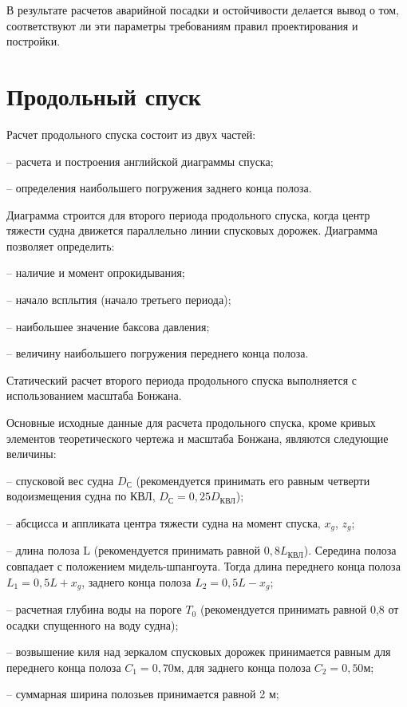 В результате расчетов аварийной посадки и остойчивости делается вывод о том, соответствуют ли эти параметры требованиям правил проектирования и постройки.

\section{Продольный спуск}

Расчет продольного спуска состоит из двух частей:

-- расчета и построения английской диаграммы спуска;

-- определения наибольшего погружения заднего конца полоза.


Диаграмма строится для второго периода продольного спуска, когда центр тяжести судна движется параллельно линии спусковых дорожек.
Диаграмма позволяет определить:

-- наличие и момент опрокидывания;

-- начало всплытия (начало третьего периода);

-- наибольшее значение баксова давления;

-- величину наибольшего погружения переднего конца полоза.

Статический расчет второго периода продольного спуска выполняется с использованием масштаба Бонжана.

Основные исходные данные для расчета продольного спуска, кроме кривых элементов теоретического чертежа и масштаба Бонжана, являются следующие величины:

-- спусковой вес судна $D_{\text{С}}$ (рекомендуется принимать его равным четверти водоизмещения судна по КВЛ, $D_{\text{С}} = 0{,}25 D_{\text{КВЛ}}$);

-- абсцисса и аппликата центра тяжести судна на момент спуска, $x_g$, $z_g$;

-- длина полоза L (рекомендуется принимать равной $0{,}8L_{\text{КВЛ}}$).
Середина полоза совпадает с положением мидель-шпангоута.
Тогда длина переднего конца полоза $L_1 = 0{,}5 L + x_g$, заднего конца полоза $L_2 = 0{,}5 L - x_g$;

-- расчетная глубина воды на пороге $T_0$ (рекомендуется принимать равной 0,8 от осадки спущенного на воду судна);

-- возвышение киля над зеркалом спусковых дорожек принимается равным для переднего конца полоза $C_1=0{,}70\mathrm{м}$, для заднего конца полоза $C_2=0{,}50\mathrm{м}$;

-- суммарная ширина полозьев принимается равной 2 м;

